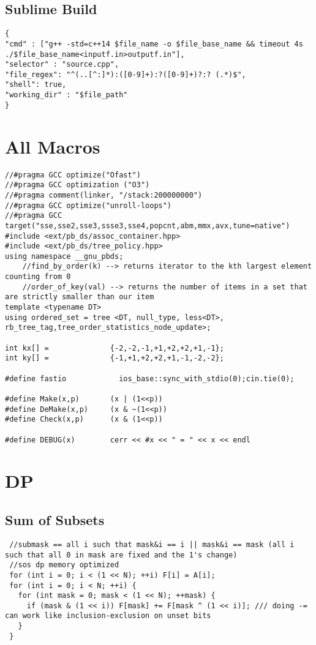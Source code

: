 \documentclass[10pt,a4paper,onesided]{article}
\begin{document}
\begin{multicols*}{3}
\tableofcontents
\newpage
{}
\subsection*{Sublime Build}
    \begin{lstlisting}
{
"cmd" : ["g++ -std=c++14 $file_name -o $file_base_name && timeout 4s ./$file_base_name<inputf.in>outputf.in"], 
"selector" : "source.cpp",
"file_regex": "^(..[^:]*):([0-9]+):?([0-9]+)?:? (.*)$",
"shell": true,
"working_dir" : "$file_path"
}
    \end{lstlisting}
\section{All Macros}
\begin{lstlisting}
//#pragma GCC optimize("Ofast")
//#pragma GCC optimization ("O3")
//#pragma comment(linker, "/stack:200000000")
//#pragma GCC optimize("unroll-loops")
//#pragma GCC target("sse,sse2,sse3,ssse3,sse4,popcnt,abm,mmx,avx,tune=native")
#include <ext/pb_ds/assoc_container.hpp>
#include <ext/pb_ds/tree_policy.hpp>
using namespace __gnu_pbds;
    //find_by_order(k) --> returns iterator to the kth largest element counting from 0
    //order_of_key(val) --> returns the number of items in a set that are strictly smaller than our item
template <typename DT> 
using ordered_set = tree <DT, null_type, less<DT>, rb_tree_tag,tree_order_statistics_node_update>;

int kx[] =              {-2,-2,-1,+1,+2,+2,+1,-1};
int ky[] =              {-1,+1,+2,+2,+1,-1,-2,-2};

#define fastio            ios_base::sync_with_stdio(0);cin.tie(0);

#define Make(x,p)       (x | (1<<p))
#define DeMake(x,p)     (x & ~(1<<p))
#define Check(x,p)      (x & (1<<p))

#define DEBUG(x)        cerr << #x << " = " << x << endl

\end{lstlisting}
\section{DP}
\subsection{Sum of Subsets}
\begin{lstlisting}
 //submask == all i such that mask&i == i || mask&i == mask (all i such that all 0 in mask are fixed and the 1's change)
 //sos dp memory optimized
 for (int i = 0; i < (1 << N); ++i) F[i] = A[i];
 for (int i = 0; i < N; ++i) {
   for (int mask = 0; mask < (1 << N); ++mask) {
     if (mask & (1 << i)) F[mask] += F[mask ^ (1 << i)]; /// doing -= can work like inclusion-exclusion on unset bits
   }
 } 
\end{lstlisting}

\end{multicols*}
\end{document}
